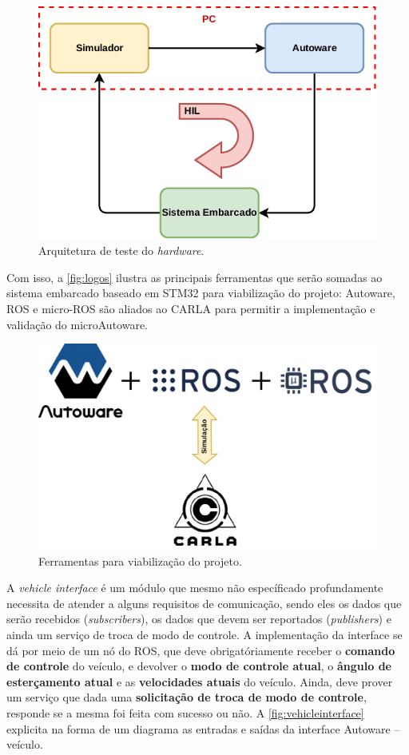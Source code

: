 \begin{figure}[H]
	\centering
	\includegraphics[width=0.55\linewidth]{img/architecture_HIL}
	\caption{Arquitetura de teste do \textit{hardware}.}
	\label{fig:architecture_HIL}
\end{figure}

Com isso, a \autoref{fig:logos} ilustra as principais ferramentas que serão somadas ao sistema embarcado baseado em STM32 para viabilização do projeto: Autoware, ROS e micro-ROS são aliados ao CARLA para permitir a implementação e validação do microAutoware.

\begin{figure}[H]
	\centering
	\includegraphics[width=0.75\linewidth]{img/logos}
	\caption{Ferramentas para viabilização do projeto.}
	\label{fig:logos}
\end{figure}

A \textit{vehicle interface} é um módulo que mesmo não específicado profundamente necessita de atender a alguns requisitos de comunicação, sendo eles os dados que serão recebidos (\textit{subscribers}), os dados que devem ser reportados (\textit{publishers}) e ainda um serviço de troca de modo de controle. A implementação da interface se dá por meio de um nó do ROS, que deve obrigatóriamente receber o \textbf{comando de controle} do veículo, e devolver o \textbf{modo de controle atual}, o \textbf{ângulo de esterçamento atual} e as \textbf{velocidades atuais} do veículo. Ainda, deve prover um serviço que dada uma \textbf{solicitação de troca de modo de controle}, responde se a mesma foi feita com sucesso ou não. A \autoref{fig:vehicleinterface} explicita na forma de um diagrama as entradas e saídas da interface Autoware -- veículo.

